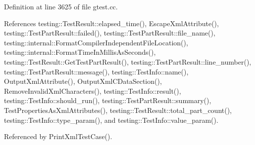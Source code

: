 Definition at line 3625 of file gtest.\+cc.



References testing\+::\+Test\+Result\+::elapsed\+\_\+time(), Escape\+Xml\+Attribute(), testing\+::\+Test\+Part\+Result\+::failed(), testing\+::\+Test\+Part\+Result\+::file\+\_\+name(), testing\+::internal\+::\+Format\+Compiler\+Independent\+File\+Location(), testing\+::internal\+::\+Format\+Time\+In\+Millis\+As\+Seconds(), testing\+::\+Test\+Result\+::\+Get\+Test\+Part\+Result(), testing\+::\+Test\+Part\+Result\+::line\+\_\+number(), testing\+::\+Test\+Part\+Result\+::message(), testing\+::\+Test\+Info\+::name(), Output\+Xml\+Attribute(), Output\+Xml\+C\+Data\+Section(), Remove\+Invalid\+Xml\+Characters(), testing\+::\+Test\+Info\+::result(), testing\+::\+Test\+Info\+::should\+\_\+run(), testing\+::\+Test\+Part\+Result\+::summary(), Test\+Properties\+As\+Xml\+Attributes(), testing\+::\+Test\+Result\+::total\+\_\+part\+\_\+count(), testing\+::\+Test\+Info\+::type\+\_\+param(), and testing\+::\+Test\+Info\+::value\+\_\+param().



Referenced by Print\+Xml\+Test\+Case().


